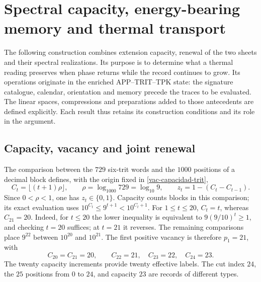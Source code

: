 \section{Spectral capacity, energy-bearing memory and thermal transport}
\label{sec:ii-ter27-antecedentes}

The following construction combines extension capacity, renewal of the two
sheets and their spectral realizations. Its purpose is to determine what a
thermal reading preserves when phase returns while the record continues to
grow. Its operations originate in the enriched APP--TRIT--TPK state: the
signature catalogue, calendar, orientation and memory precede the traces
to be evaluated. The linear spaces, compressions and preparations added
to those antecedents are defined explicitly. Each result thus retains its
construction conditions and its role in the argument.

\subsection{Capacity, vacancy and joint renewal}
\label{sec:ii-ter27-capacidad}

The comparison between the $729$ six-trit words and the $1000$ positions
of a decimal block defines, with the origin fixed in
\ref{vac-capacidad-trit},
\begin{equation}
 C_t=\lfloor(t+1)\rho\rfloor,
 \qquad \rho=\log_{1000}729=\log_{10}9,
 \qquad z_t=1-(C_t-C_{t-1}).
 \label{eq:ii-ter27-capacidad}
\end{equation}
Since $0<\rho<1$, one has $z_t\in\{0,1\}$. Capacity counts blocks in
this comparison; its exact evaluation uses
$10^{C_t}\leq9^{t+1}<10^{C_t+1}$. For $1\leq t\leq20$, $C_t=t$,
whereas $C_{21}=20$. Indeed, for $t\leq20$ the lower inequality is
equivalent to $9(9/10)^t\geq1$, and checking $t=20$ suffices; at $t=21$
it reverses. The remaining comparisons place $9^{22}$ between
$10^{20}$ and $10^{21}$. The first positive vacancy is therefore
$p_1=21$, with
\[
 C_{20}=C_{21}=20,\qquad C_{22}=21,\quad C_{23}=22,\quad C_{24}=23.
\]
The twenty capacity increments provide twenty effective labels. The
cut index $24$, the $25$ positions from $0$ to $24$, and capacity $23$
are records of different types.

